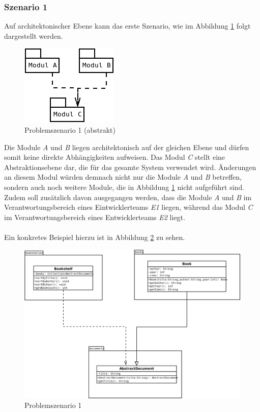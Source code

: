 \documentclass[11pt, 
ngerman,
doublespacing,
chapterinoneline, %
consistentlayout, %
]{scrartcl}
\begin{document}
\subsubsection{Szenario 1}\label{prob1}
Auf architektonischer Ebene kann das erste Szenario, wie im Abbildung \ref{fig:problem} folgt dargestellt werden.
\begin{figure}[h]
  \centering
  \includegraphics[scale = 0.7]{pics/problemS1Abstrakt.png}
  \caption{Problemszenario 1 (abstrakt)}
  \label{fig:problem}
\end{figure}
Die Module \emph{A} und \emph{B} liegen architektonisch auf der gleichen Ebene und dürfen somit keine direkte Abhängigkeiten aufweisen. Das Modul \emph{C} stellt eine Abstraktionsebene dar, die für das gesamte System verwendet wird. Änderungen an diesem Modul würden demnach nicht nur die Module \emph{A} und \emph{B} betreffen, sondern auch noch weitere Module, die in Abbildung \ref{fig:problem} nicht aufgeführt sind. Zudem soll zusätzlich davon ausgegangen werden, dass die Module \emph{A} und \emph{B} im Verantwortungsbereich eines Eintwicklerteams \emph{E1} liegen, während das Modul \emph{C} im Verantwortungsbereich eines Entwicklerteams \emph{E2} liegt.\\\\
Ein konkretes Beispiel hierzu ist in Abbildung \ref{fig:problem1Konkret} zu sehen.
\begin{figure}[h]
  \centering
  \includegraphics[scale = 0.3]{pics/problemS1Konkret.png}
  \caption{Problemszenario 1}
  \label{fig:problem1Konkret}
\end{figure}\\
\end{document}
